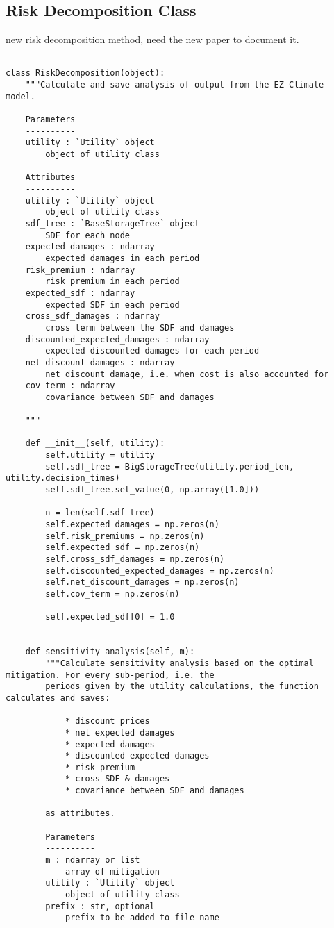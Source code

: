 \documentclass[12pt]{article}
\begin{document}
\subsection{Risk Decomposition Class}
new risk decomposition method, need the new paper to document it.
\begin{verbatim}

class RiskDecomposition(object):
	"""Calculate and save analysis of output from the EZ-Climate model.

	Parameters
	----------
	utility : `Utility` object
		object of utility class

	Attributes
	----------
	utility : `Utility` object
		object of utility class
	sdf_tree : `BaseStorageTree` object
		SDF for each node
	expected_damages : ndarray
		expected damages in each period
	risk_premium : ndarray
		risk premium in each period
	expected_sdf : ndarray
		expected SDF in each period
	cross_sdf_damages : ndarray
		cross term between the SDF and damages
	discounted_expected_damages : ndarray
		expected discounted damages for each period
	net_discount_damages : ndarray
		net discount damage, i.e. when cost is also accounted for
	cov_term : ndarray
		covariance between SDF and damages

	"""

	def __init__(self, utility):
		self.utility = utility
		self.sdf_tree = BigStorageTree(utility.period_len, utility.decision_times)
		self.sdf_tree.set_value(0, np.array([1.0]))

		n = len(self.sdf_tree)
		self.expected_damages = np.zeros(n)
		self.risk_premiums = np.zeros(n)
		self.expected_sdf = np.zeros(n)
		self.cross_sdf_damages = np.zeros(n)
		self.discounted_expected_damages = np.zeros(n)
		self.net_discount_damages = np.zeros(n)
		self.cov_term = np.zeros(n)

		self.expected_sdf[0] = 1.0


	def sensitivity_analysis(self, m):
		"""Calculate sensitivity analysis based on the optimal mitigation. For every sub-period, i.e. the
		periods given by the utility calculations, the function calculates and saves:
			
			* discount prices
			* net expected damages
			* expected damages
			* discounted expected damages
			* risk premium
			* cross SDF & damages
			* covariance between SDF and damages

		as attributes.

		Parameters
		----------
		m : ndarray or list
			array of mitigation
		utility : `Utility` object
			object of utility class
		prefix : str, optional
			prefix to be added to file_name


\end{verbatim}
\end{document}
